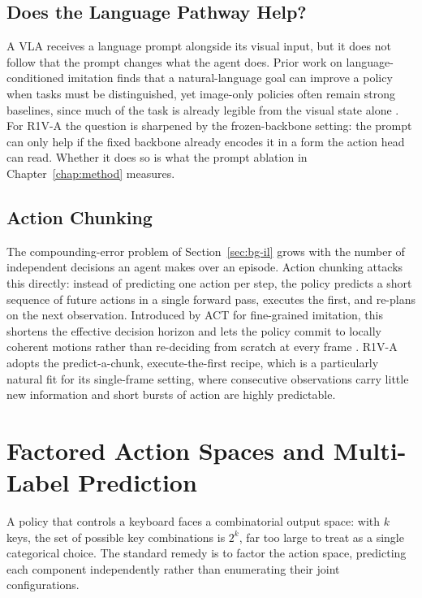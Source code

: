\subsection{Does the Language Pathway Help?}
\label{subsec:bg-language}
A VLA receives a language prompt alongside its visual input, but it does not
follow that the prompt changes what the agent does. Prior work on
language-conditioned imitation finds that a natural-language goal can improve
a policy when tasks must be distinguished, yet image-only policies often
remain strong baselines, since much of the task is already legible from the
visual state alone \cite{lynch2021langlfp}. For R1V-A the question is
sharpened by the frozen-backbone setting: the prompt can only help if the
fixed backbone already encodes it in a form the action head can read.
Whether it does so is what the prompt ablation in Chapter~\ref{chap:method}
measures.

\subsection{Action Chunking}
\label{subsec:bg-chunking}
The compounding-error problem of Section~\ref{sec:bg-il} grows with the
number of independent decisions an agent makes over an episode. Action
chunking attacks this directly: instead of predicting one action per step,
the policy predicts a short sequence of future actions in a single forward
pass, executes the first, and re-plans on the next observation. Introduced by
ACT for fine-grained imitation, this shortens the effective decision horizon
and lets the policy commit to locally coherent motions rather than
re-deciding from scratch at every frame \cite{zhao2023act}. R1V-A adopts the
predict-a-chunk, execute-the-first recipe, which is a particularly natural
fit for its single-frame setting, where consecutive observations carry
little new information and short bursts of action are highly predictable.


\section{Factored Action Spaces and Multi-Label Prediction}
\label{sec:bg-action}
A policy that controls a keyboard faces a combinatorial output space: with
$k$ keys, the set of possible key combinations is $2^k$, far too large to
treat as a single categorical choice. The standard remedy is to factor the
action space, predicting each component independently rather than enumerating
their joint configurations.

